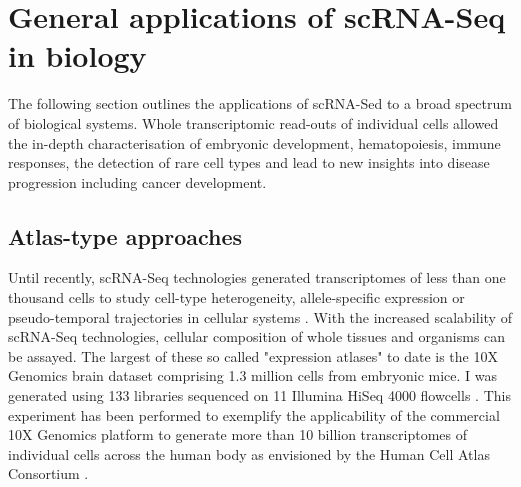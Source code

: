 
\section{General applications of scRNA-Seq in biology}

The following section outlines the applications of scRNA-Sed to a broad spectrum of biological systems. Whole transcriptomic read-outs of individual cells allowed the in-depth characterisation of embryonic development, hematopoiesis, immune responses, the detection of rare cell types and lead to new insights into disease progression including cancer development. 

\subsection{Atlas-type approaches}

Until recently, scRNA-Seq technologies generated transcriptomes of less than one thousand cells to study cell-type heterogeneity, allele-specific expression or pseudo-temporal trajectories in cellular systems \citep{Kolodziejczyk2015review}. With the increased scalability of scRNA-Seq technologies, cellular composition of whole tissues and organisms can be assayed. The largest of these so called "expression atlases" to date is the 10X Genomics\textsuperscript{\textregistered}{} brain dataset comprising 1.3 million cells from embryonic mice. I was generated using 133 libraries sequenced on 11 Illumina HiSeq\textsuperscript{\textregistered}{} 4000 flowcells \citep{10XGenomics2017}. This experiment has been performed to exemplify the applicability of the commercial 10X Genomics platform to generate more than 10 billion transcriptomes of individual cells across the human body as envisioned by the Human Cell Atlas Consortium \citep{Regev2017}.\\

